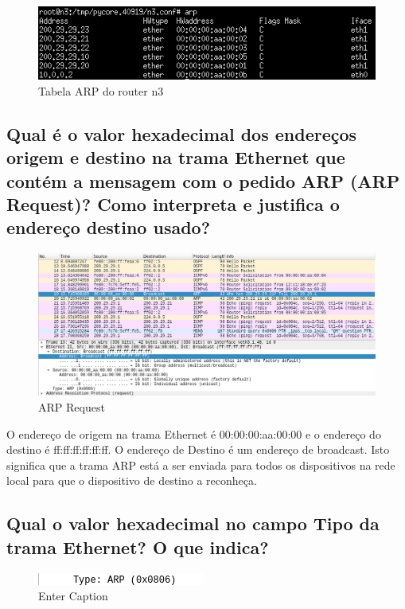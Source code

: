 \begin{figure} [h]
    \centering
    \includegraphics[width=0.8\linewidth]{images/tabela-arp-n3.png}
    \caption{Tabela ARP do router n3}
    \label{fig:enter-label}
\end{figure}

\subsection{Qual é o valor hexadecimal dos endereços origem e destino na trama Ethernet que contém a mensagem com o pedido ARP (ARP Request)? Como interpreta e justifica o endereço destino usado?}

\begin{figure} [h]
    \centering
    \includegraphics[width=0.8\linewidth]{images/arp-request-1.png}
    \caption{ARP Request}
    \label{fig:enter-label}
\end{figure}

O endereço de origem na trama Ethernet é 00:00:00:aa:00:00 e o endereço do destino é ff:ff:ff:ff:ff:ff. O endereço de Destino é um endereço de broadcast. Isto significa que a trama ARP está a ser enviada para todos os dispositivos na rede local para que o dispositivo de destino a reconheça. 

\subsection{Qual o valor hexadecimal no campo Tipo da trama Ethernet? O que indica?}


\begin{figure} [h]
    \centering
    \includegraphics[width=0.5\linewidth]{images/tipo-arp-request.png}
    \caption{Enter Caption}
    \label{fig:enter-label}
\end{figure}


